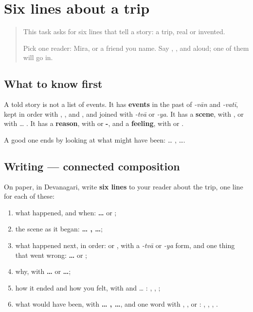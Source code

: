 \section[(six lines)]{Six lines about a trip}

\label{lesson:SA-W285-six-lines}



\begin{quote}
This task asks for six lines that tell a story: a trip, real or invented.

Pick one reader: Mira, or a friend you name. Say \textbf{}, \textbf{}, \textbf{} and \textbf{} aloud; one of them will go in.
\end{quote}

\subsection*{What to know first}
A told story is not a list of events. It has \textbf{events} in the past of \emph{-vān} and \emph{-vatī}, kept in order with \textbf{}, \textbf{}, \textbf{} and \textbf{}, and joined with \emph{-tvā} or \emph{-ya}. It has a \textbf{scene}, with \textbf{}, or with \textbf{} … \textbf{}. It has a \textbf{reason}, with \textbf{} or \textbf{-}, and a \textbf{feeling}, with \textbf{  } or \textbf{}.

A good one ends by looking at what might have been: \textbf{} … \textbf{}, \textbf{} ….

\subsection*{Writing — connected composition}
On paper, in Devanagari, write \textbf{six lines} to your reader about the trip, one line for each of these:

\begin{enumerate}
\raggedright
  \item what happened, and when: \textbf{  … } or \textbf{};
  \item the scene as it began: \textbf{  … ,  …};
  \item what happened next, in order: \textbf{} or \textbf{}, with a \emph{-tvā} or \emph{-ya} form, and one thing that went wrong: \textbf{… } or \textbf{ };
  \item why, with \textbf{ …} or \textbf{…};
  \item how it ended and how you felt, with \textbf{} and \textbf{} … \textbf{}: \textbf{}, \textbf{}, \textbf{};
  \item what would have been, with \textbf{ … ,  …}, and one word with \textbf{}, \textbf{}, \textbf{} or \textbf{}: \textbf{}, \textbf{}, \textbf{}, \textbf{}.
\end{enumerate}

